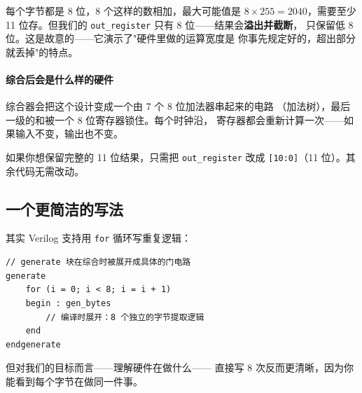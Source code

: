 每个字节都是 8 位，8 个这样的数相加，最大可能值是
\( 8 \times 255 = 2040 \)，需要至少 11 位存。但我们的
\texttt{out\_register} 只有 8 位——结果会\textbf{溢出并截断}，
只保留低 8 位。这是故意的——它演示了"硬件里做的运算宽度是
你事先规定好的，超出部分就丢掉"的特点。

\paragraph{综合后会是什么样的硬件}
综合器会把这个设计变成一个由 7 个 8 位加法器串起来的电路
（加法树），最后一级的和被一个 8 位寄存器锁住。每个时钟沿，
寄存器都会重新计算一次——如果输入不变，输出也不变。

如果你想保留完整的 11 位结果，只需把 \texttt{out\_register}
改成 \texttt{[10:0]}（11 位）。其余代码无需改动。

\subsection{一个更简洁的写法}

其实 Verilog 支持用 \texttt{for} 循环写重复逻辑：

\begin{lstlisting}[style=verilog,caption=用 generate 写的简化版本]
// generate 块在综合时被展开成具体的门电路
generate
    for (i = 0; i < 8; i = i + 1)
    begin : gen_bytes
        // 编译时展开：8 个独立的字节提取逻辑
    end
endgenerate
\end{lstlisting}

但对我们的目标而言——理解硬件在做什么——
直接写 8 次反而更清晰，因为你能看到每个字节在做同一件事。

